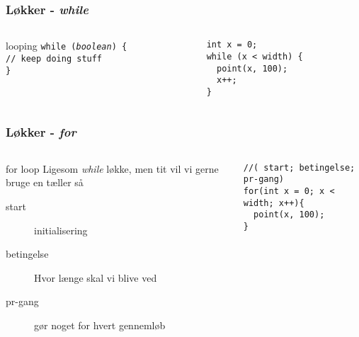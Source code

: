 \documentclass{beamer}
\begin{document}
\begin{frame}[fragile]
  \frametitle{Løkker - \emph{while}}
  \begin{columns}
    \begin{column}{0.5\textwidth}
      \begin{block}{looping}
        \texttt{while (\emph{boolean}) \{ }\\
        \texttt{// keep doing stuff} \\
        \texttt{\}}\\
        \vspace{1cm}
      \end{block}
    \end{column}
    \begin{column}{0.5\textwidth}
\begin{verbatim} 
int x = 0;
while (x < width) {
  point(x, 100);
  x++;
}
\end{verbatim}
    \end{column}
  \end{columns}
\end{frame}


\begin{frame}[fragile]
  \frametitle{Løkker - \emph{for}}
  \begin{columns}
    \begin{column}{0.45\textwidth}
      \begin{block}{for loop}
        Ligesom \emph{while} løkke, men tit vil vi gerne bruge en tæller så\\
        \begin{description}
        \item[start] initialisering
        \item[betingelse] Hvor længe skal vi blive ved
        \item[pr-gang] gør noget for hvert gennemløb
        \end{description}
        
      \end{block}
    \end{column}
    \begin{column}{0.55\textwidth}
\begin{verbatim} 
//( start; betingelse; pr-gang)
for(int x = 0; x < width; x++){
  point(x, 100);
}
\end{verbatim}
    \end{column}
  \end{columns}
\end{frame}
\end{document}
